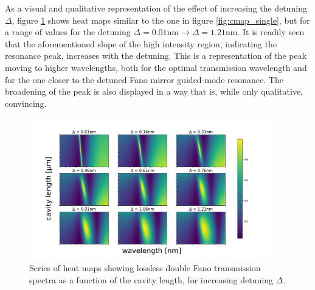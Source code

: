 As a visual and qualitative representation of the effect of increasing the detuning $\Delta$, figure \ref{fig:cmaps_detuning} shows heat maps similar to the one in figure \ref{fig:cmap_single}, but for a range of values for the detuning $\Delta=0.01$nm$ \rightarrow \Delta=1.21$nm. It is readily seen that the aforementioned slope of the high intensity region, indicating the resonance peak, increases with the detuning. This is a representation of the peak moving to higher wavelengths, both for the optimal transmission wavelength and for the one closer to the detuned Fano mirror guided-mode resonance. The broadening of the peak is also displayed in a way that is, while only qualitative, convincing. 

\begin{figure}[h!]
    \centering
    \includegraphics[width=0.95\textwidth]{figures/cmaps_detuning_30um.pdf}
    \caption{Series of heat maps showing lossless double Fano transmission spectra as a function of the cavity length, for increasing detuning $\Delta$.}
    \label{fig:cmaps_detuning}
\end{figure}

